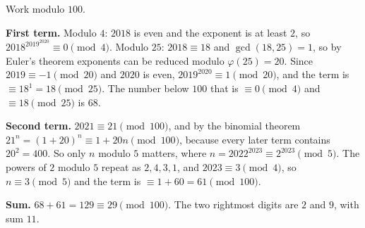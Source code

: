 Work modulo $100$.

\textbf{First term.} Modulo $4$: $2018$ is even and the exponent is at least $2$, so $2018^{2019^{2020}}\equiv0\pmod4$. Modulo $25$: $2018\equiv18$ and $\gcd(18,25)=1$, so by Euler's theorem exponents can be reduced modulo $\varphi(25)=20$. Since $2019\equiv-1\pmod{20}$ and $2020$ is even, $2019^{2020}\equiv1\pmod{20}$, and the term is $\equiv18^1=18\pmod{25}$. The number below $100$ that is $\equiv0\pmod4$ and $\equiv18\pmod{25}$ is $68$.

\textbf{Second term.} $2021\equiv21\pmod{100}$, and by the binomial theorem $21^n=(1+20)^n\equiv1+20n\pmod{100}$, because every later term contains $20^2=400$. So only $n$ modulo $5$ matters, where $n=2022^{2023}\equiv2^{2023}\pmod5$. The powers of $2$ modulo $5$ repeat as $2,4,3,1$, and $2023\equiv3\pmod4$, so $n\equiv3\pmod5$ and the term is $\equiv1+60=61\pmod{100}$.

\textbf{Sum.} $68+61=129\equiv29\pmod{100}$. The two rightmost digits are $2$ and $9$, with sum $\boxed{11}$.
